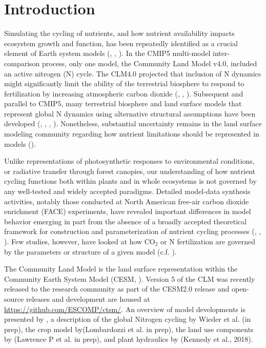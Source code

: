 \documentclass[draft,linenumbers]{agujournal}
\begin{document}
\section{Introduction}

Simulating the cycling of nutrients, and how nutrient availability impacts ecosystem growth and function, has been repeatedly identified as a crucial element of Earth system models (\cite{piao2013}, \cite{gruber2008}, \cite{wang2009}). In the CMIP5 multi-model inter-comparison process, only one model, the Community Land Model v4.0, included an active nitrogen (N) cycle. The CLM4.0 projected that inclusion of N dynamics might significantly limit the ability of the terrestrial biosphere to respond to fertilization by increasing atmospheric carbon dioxide (\cite{friedlingstein2006}, \cite{friedlingstein2014}, \cite{arora2013}). Subsequent and parallel to CMIP5, many terrestrial biosphere and land surface models that represent global N dynamics using alternative structural assumptions have been developed (\cite{wang2007}, \cite{zaehle2010}, \cite{goll2012}, \cite{smith2014}). Nonetheless, substantial uncertainty remains in the land surface modeling community regarding how nutrient limitations should be represented in models (\cite{zaehle2011}).


Unlike representations of photosynthetic responses to environmental conditions, or radiative transfer through forest canopies, our understanding of how nutrient cycling functions both within plants and in whole ecosystems is not governed by any well-tested and widely accepted paradigms. Detailed model-data synthesis activities, notably those conducted at North American free-air carbon dioxide enrichment (FACE) experiments, have revealed important differences in model behavior emerging in part from the absence of a broadly accepted theoretical framework for construction and parameterization of nutrient cycling processes (\cite{kauwe2013}, \cite{zaehle2014}, \cite{medlyn2015}). Few studies, however, have looked at how CO$_{2}$ or N fertilization are governed by the parameters or structure of a given model  (c.f. \cite{meyerholt2018}).


The Community Land Model is the land surface representation within the Community Earth System Model (CESM, \cite{hurrell2013}). Version 5 of the CLM was recently released to the research community as part of the CESM2.0 release and open-source releases and development are housed at \url{https://github.com/ESCOMP/ctsm/}. An overview of model developments is presented by \cite{lawrence2018}, a description of the global Nitrogen cycling by Wieder et al. (in prep), the crop model by(Lombardozzi et al. in prep), the land use components by (Lawrence P et al. in prep), and plant hydraulics by (Kennedy et al., 2018).
\end{document}
